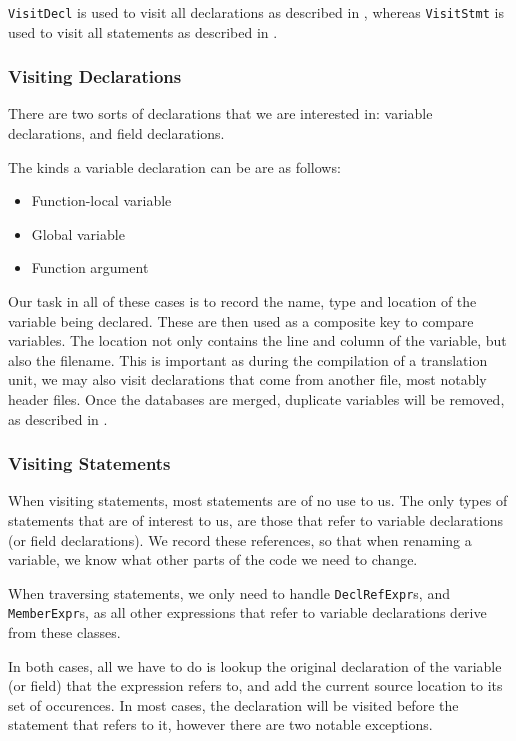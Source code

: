 \lstinline|VisitDecl| is used to visit all declarations as described in
, whereas \lstinline|VisitStmt| is used to visit all
statements as described in .

\subsubsection{Visiting Declarations}
\label{sec:visitdecl}
There are two sorts of declarations that we are interested in: variable
declarations, and field declarations.

The kinds a variable declaration can be are as follows:
\begin{itemize}
	\item Function-local variable
	\item Global variable
	\item Function argument
\end{itemize}

Our task in all of these cases is to record the name, type and location of the
variable being declared. These are then used as a composite key to compare
variables. The location not only contains the line and column of the variable,
but also the filename. This is important as during the compilation of a
translation unit, we may also visit declarations that come from another file,
most notably header files. Once the databases are merged, duplicate variables
will be removed, as described in .

\subsubsection{Visiting Statements}
\label{sec:visitstmt}
When visiting statements, most statements are of no use to us. The only types
of statements that are of interest to us, are those that refer to variable
declarations (or field declarations). We record these references, so that when
renaming a variable, we know what other parts of the code we need to change.

When traversing statements, we only need to handle \lstinline|DeclRefExpr|s, and
\lstinline|MemberExpr|s, as all other expressions that refer to variable
declarations derive from these classes.

In both cases, all we have to do is lookup the original declaration of the
variable (or field) that the expression refers to, and add the current source
location to its set of occurences. In most cases, the declaration will be
visited before the statement that refers to it, however there are two notable
exceptions.

